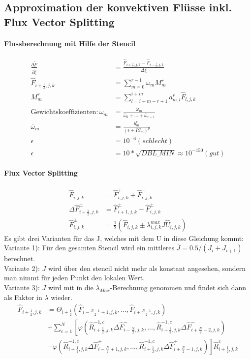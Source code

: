\subsection{Approximation der konvektiven Flüsse inkl. Flux Vector Splitting}
 \paragraph*{Flussberechnung mit Hilfe der Stencil}
\begin{align*}
\frac{\partial \tilde{F}}{\partial \tilde{\xi}}&=
\frac{\hat{F}_{i+\frac{1}{2},j,k} -\hat{F}_{i-\frac{1}{2},j,k}}{\varDelta \xi}
\\
\hat{F}_{i+\frac{1}{2},j,k}&=\sum_{m=0}^{r-1} \omega_m M^r_m
\\
M^r_m&=\sum_{l=i+m-r+1}^{i+m} a^r_{m,l} \hat{F}_{l,j,k}
\\
\text{Gewichtskoeffizienten}:
\omega_m &=\frac{\bar{\omega}_m}{\bar{\omega}_0+...+\bar{\omega}_{r-1}}
\\
\bar{\omega}_m&=\frac{b_m^r}{\left(\epsilon+IS_m\right)^p}
\\
\epsilon &= 10^{-6} (schlecht)
\\
\epsilon &= 10*\sqrt{DBL\_ MIN}\approx 10^{-150} (gut)
\end{align*}
 \paragraph*{Flux Vector Splitting}
\begin{align*}
\hat{F}_{i,j,k}&=\hat{F}^{+}_{i,j,k}+\hat{F}^{-}_{i,j,k}
\\
 \varDelta \hat{F}^{\pm}_{i+\frac{1}{2},j,k}&=\hat{F}^{\pm}_{i+1,j,k}-\hat{F}^{\pm}_{i,j,k}
\\
\hat{F}^{\pm}_{i,j,k}&=\frac{1}{2}\left(\hat{F}_{i,j,k} \pm \lambda_{i,j,k}^{max} J \hat{U}_{i,j,k} \right)
\end{align*}
Es gibt drei Varianten für das J, welches mit dem U in diese Gleichung kommt:\\
Variante 1): Für den gesamten Stencil wird ein mittleres $\bar{J}=0.5/(J_i+J_{i+1})$ berechnet. \\
Variante 2): $J$ wird über den stencil nicht mehr als konstant angesehen, sondern man nimmt für jeden Punkt den lokalen Wert. \\
Variante 3): $J$ wird mit in die $\lambda_{Max}$-Berechnung genommen und findet sich dann als Faktor in $\lambda$ wieder.
\begin{align*}
\hat{F}_{i+\frac{1}{2},j,k}&=\Theta_{i+\frac{1}{2}}\left(\hat{F}_{i-\frac{N-1}{2}+1,j,k},...,\hat{F}_{i+\frac{N-1}{2},j,k}\right)
\\
&+\sum^N_{c=1}
\left[ 
\varphi\left(\hat{R}^{-1,c}_{i+\frac{1}{2},j,k}\varDelta \hat{F}^{-}_{i-\frac{N}{2},j,k},...,\hat{R}^{-1,c}_{i+\frac{1}{2},j,k}\varDelta \hat{F}^{-}_{i+\frac{N}{2}-2,j,k} \right)
\right.
\\
&-
\left.
\varphi\left(\hat{R}^{-1,c}_{i+\frac{1}{2},j,k}\varDelta \hat{F}^{+}_{i-\frac{N}{2}+1,j,k},...,\hat{R}^{-1,c}_{i+\frac{1}{2},j,k}\varDelta \hat{F}^{+}_{i+\frac{N}{2}-1,j,k} \right)
\right]\hat{R}^{c}_{i+\frac{1}{2},j,k}
\end{align*}

